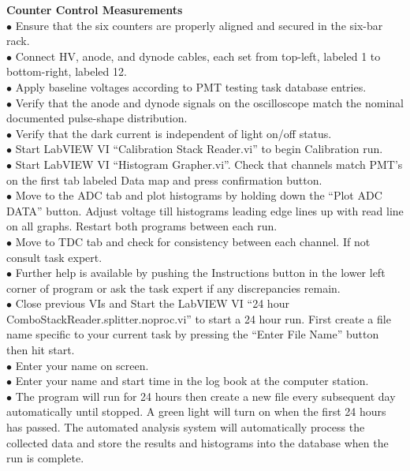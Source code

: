 \textbf{\color[rgb]{1,0.5,0}Counter Control Measurements}\\
$\bullet$ Ensure that the six counters are properly aligned and secured in the six-bar rack.\\
$\bullet$ Connect HV, anode, and dynode cables, each set from top-left, labeled 1 to bottom-right, labeled 12.\\
$\bullet$ Apply baseline voltages according to PMT testing task database entries.\\
$\bullet$ Verify that the anode and dynode signals on the oscilloscope match the nominal documented pulse-shape distribution.\\
$\bullet$ Verify that the dark current is independent of light on/off status.\\
$\bullet$ Start LabVIEW VI ``Calibration Stack Reader.vi'' to begin Calibration run.\\
$\bullet$ Start LabVIEW VI ``Histogram Grapher.vi''. Check that channels match PMT's on the first tab labeled Data map and press confirmation button.\\
$\bullet$ Move to the ADC tab and plot histograms by holding down the ``Plot ADC DATA'' button. Adjust voltage till histograms leading edge lines up with read line on all graphs. Restart both programs between each run.\\
$\bullet$ Move to TDC tab and check for consistency between each channel. If not consult task expert.\\
$\bullet$ Further help is available by pushing the Instructions button in the lower left corner of program or ask the task expert if any discrepancies remain.\\
$\bullet$ Close previous VIs and Start the LabVIEW VI ``24 hour ComboStackReader.splitter.noproc.vi'' to start a 24 hour run. First create a file name specific to your current task by pressing the ``Enter File Name'' button then hit start.\\
$\bullet$ Enter your name on screen.\\
$\bullet$ Enter your name and start time in the log book at the computer station.\\
$\bullet$ The program will run for 24 hours then create a new file every subsequent day automatically until stopped. A green light will turn on when the first 24 hours has passed. The automated analysis system will automatically process the collected data and store the results and histograms into the database when the run is complete.\\

